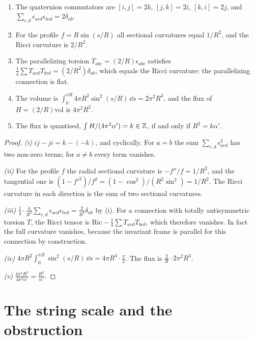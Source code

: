 \begin{proposition}[Geometry of $S^3(R)$]\label{prop:s3group}\ver\
\begin{enumerate}[label=(\roman*)]
\item The quaternion commutators are $[i,j]=2k$, $[j,k]=2i$, $[k,i]=2j$, and $\sum_{c,d}\epsilon_{acd}\epsilon_{bcd}=2\delta_{ab}$.
\item For the profile $f=R\sin(s/R)$ all sectional curvatures equal $1/R^2$, and the Ricci curvature is $2/R^2$.
\item The parallelizing torsion $T_{abc}=(2/R)\epsilon_{abc}$ satisfies $\frac14\sum T_{acd}T_{bcd}=(2/R^2)\delta_{ab}$, which equals the Ricci curvature: the parallelizing connection is flat.
\item The volume is $\int_0^{\pi R}4\pi R^2\sin^2(s/R)\,\dd s=2\pi^2R^3$, and the flux of $H=(2/R)\mathrm{vol}$ is $4\pi^2R^2$.
\item The flux is quantised, $\int H/(4\pi^2\alpha')=k\in\mathbb{Z}$, if and only if $R^2=k\alpha'$.
\end{enumerate}
\end{proposition}
\begin{proof}
\emph{(i)} $ij-ji=k-(-k)$, and cyclically. For $a=b$ the sum $\sum_{c,d}\epsilon_{acd}^2$ has two non-zero terms; for $a\ne b$ every term vanishes.

\emph{(ii)} For the profile $f$ the radial sectional curvature is $-f''/f=1/R^2$, and the tangential one is $(1-f'^2)/f^2=(1-\cos^2)/(R^2\sin^2)=1/R^2$. The Ricci curvature in each direction is the sum of two sectional curvatures.

\emph{(iii)} $\frac14\cdot\frac4{R^2}\sum_{c,d}\epsilon_{acd}\epsilon_{bcd}=\frac2{R^2}\delta_{ab}$ by (i). For a connection with totally antisymmetric torsion $T$, the Ricci tensor is $\mathrm{Ric}-\frac14\sum T_{acd}T_{bcd}$, which therefore vanishes. In fact the full curvature vanishes, because the invariant frame is parallel for this connection by construction.

\emph{(iv)} $4\pi R^2\int_0^{\pi R}\sin^2(s/R)\,\dd s=4\pi R^3\cdot\frac\pi2$. The flux is $\frac2R\cdot2\pi^2R^3$.

\emph{(v)} $\frac{4\pi^2R^2}{4\pi^2\alpha'}=\frac{R^2}{\alpha'}$.
\end{proof}


\section{The string scale and the obstruction}

